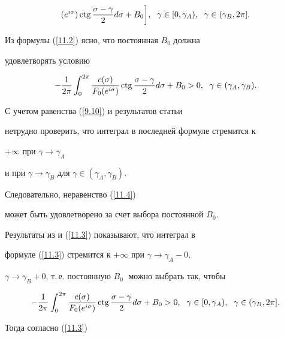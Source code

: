 {\begin{gather}
{(e^{i\sigma})}\ctg \frac{\sigma -\gamma}{2}d\sigma + B_{0}\bigg],


\ \;\gamma\in [0,\gamma_{A}),\ \;\gamma\in(\gamma_{B},2\pi].


\end{gather}





Из формулы (\ref{11.2}) ясно, что постоянная $B_{0}$ должна


удовлетворять условию


\begin{equation}\label{11.4}


-\frac{1}{2\pi}\int_{0}^{2\pi}\frac{c(\sigma)}{F_{0}


(e^{i\sigma})}\ctg \frac{\sigma -\gamma}{2}d\sigma + B_{0} > 0,


\ \;\gamma\in (\gamma_{A},\gamma_{B}).


\end{equation}





С учетом равенства (\ref{9.10}) и результатов статьи \cite{Sa}


нетрудно проверить, что интеграл в последней формуле стремится к


$+\infty$ при $\gamma\to\gamma_{A}$ 


и при $\gamma\to\gamma_{B}$ для $\gamma\in (\gamma_{A},\gamma_{B})$.


Следовательно, неравенство (\ref{11.4})


может быть удовлетворено за счет выбора постоянной $B_{0}$.


Результаты из \cite{Sa} и (\ref{11.3}) показывают, что интеграл в


формуле (\ref{11.3}) стремится к $+\infty$ при $\gamma\to\gamma_{A}-0$,


$\gamma\to\gamma_{B}+0$, т.\,е. постоянную $B_{0}\;$ можно выбрать так, чтобы


\begin{equation}\label{11.6}


-\frac{1}{2\pi}\int_{0}^{2\pi}\frac{c(\sigma)}{F_{0}


(e^{i\sigma})}\ctg \frac{\sigma -\gamma}{2}d\sigma + B_{0} > 0,


\ \;\gamma\in [0,\gamma_{A}),\ \;\gamma\in(\gamma_{B},2\pi].


\end{equation}


Тогда согласно (\ref{11.3})


}

